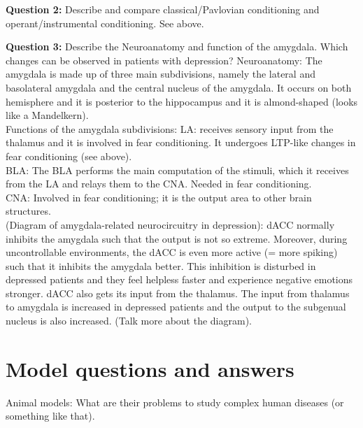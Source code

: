 \documentclass[twosided, a4paper, pt11]{article}
\begin{document}
	\textbf{Question 2:} Describe and compare classical/Pavlovian conditioning and operant/instrumental conditioning.\newline
	See above.\newline
	
	\textbf{Question 3:} Describe the Neuroanatomy and function of the amygdala. Which changes can be observed in patients with depression?
	Neuroanatomy: The amygdala is made up of three main subdivisions, namely the lateral and basolateral amygdala and the central nucleus of the amygdala. It occurs on both hemisphere and it is posterior to the hippocampus and it is almond-shaped (looks like a Mandelkern).\\
	Functions of the amygdala subdivisions: LA: receives sensory input from the thalamus and it is involved in fear conditioning. It undergoes LTP-like changes in fear conditioning (see above).\\
	BLA: The BLA performs the main computation of the stimuli, which it receives from the LA and relays them to the CNA. Needed in fear conditioning.\\
	CNA: Involved in fear conditioning; it is the output area to other brain structures.\\
	(Diagram of amygdala-related neurocircuitry in depression): dACC normally inhibits the amygdala such that the output is not so extreme. Moreover, during uncontrollable environments, the dACC is even more active (= more spiking) such that it inhibits the amygdala better. This inhibition is disturbed in depressed patients and they feel helpless faster and experience negative emotions stronger. dACC also gets its input from the thalamus. The input from thalamus to amygdala is increased in depressed patients and the output to the subgenual nucleus is also increased. (Talk more about the diagram).
	
	\section{Model questions and answers}
	Animal models: What are their problems to study complex human diseases (or something like that).
	
	
\end{document}
